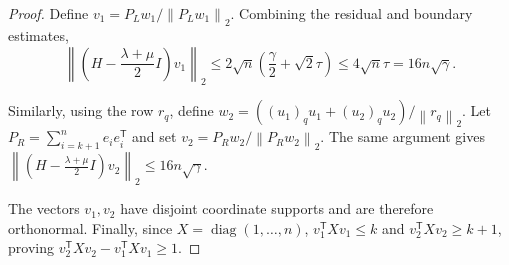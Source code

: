 \documentclass[10pt,a4paper]{article}
\newcommand{\norm}[1]{\left\lVert #1\right\rVert}
\DeclareMathOperator{\diag}{diag}
\begin{document}
\begin{proof}
Define $v_1=P_Lw_1/\norm{P_Lw_1}_2$.
Combining the residual and boundary estimates,
\[
\left\lVert
\left(H-\frac{\lambda+\mu}{2}I\right)v_1
\right\rVert_2
\leq2\sqrt n\left(\frac\gamma2+\sqrt2\tau\right)
\leq4\sqrt n\tau=16n\sqrt\gamma.
\]

Similarly, using the row $r_q$, define
$w_2=((u_1)_q u_1+(u_2)_q u_2)/\norm{r_q}_2$.
Let $P_R=\sum_{i=k+1}^n e_ie_i^{\mathsf T}$
and set $v_2=P_Rw_2/\norm{P_Rw_2}_2$.
The same argument gives
$\left\lVert(H-\frac{\lambda+\mu}{2}I)v_2
\right\rVert_2\leq16n\sqrt\gamma$.

The vectors $v_1,v_2$ have disjoint coordinate
supports and are therefore orthonormal.
Finally, since $X=\diag(1,\ldots,n)$,
$v_1^{\mathsf T}Xv_1\leq k$ and
$v_2^{\mathsf T}Xv_2\geq k+1$, proving
$v_2^{\mathsf T}Xv_2-v_1^{\mathsf T}Xv_1\geq1$.
\end{proof}
\end{document}
